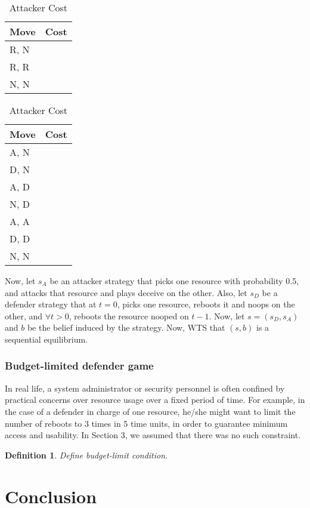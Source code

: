 \documentclass[11pt]{article}
\theoremstyle{plain}
\newtheorem*{definition}{Definition}
\begin{document}
\begin{table}[!htb]
    \caption{Cost Table}
    \begin{minipage}{.5\linewidth}
      \caption{Defender Cost}
      \centering
        \begin{tabular}{|l|l|}
\hline
Move & Cost \\ \hline
R, N &      \\ \hline
R, R &      \\ \hline
N, N &      \\ \hline
\end{tabular}
    \end{minipage}%
    \begin{minipage}{.5\linewidth}
      \centering
        \caption{Attacker Cost}
\begin{tabular}{|l|l|}
\hline
Move & Cost \\ \hline
A, N &      \\ \hline
D, N &      \\ \hline
A, D &      \\ \hline
N, D &      \\ \hline
A, A &      \\ \hline
D, D &      \\ \hline
N, N &      \\ \hline
\end{tabular}
    \end{minipage} 
\end{table}
Now, let $s_A$ be an attacker strategy that picks one resource with probability 0.5, and attacks that resource and plays deceive on the other. Also, let $s_D$ be a defender strategy that at $t=0$, picks one resource, reboots it and noops on the other, and $\forall t>0$, reboots the resource nooped on $t-1$. Now, let $s=(s_D,s_A)$ and $b$ be the belief induced by the strategy. Now, WTS that $(s,b)$ is a sequential equilibrium.



\subsubsection{Budget-limited defender game}
In real life, a system administrator or security personnel is often confined by practical concerns over resource usage over a fixed period of time. For example, in the case of a defender in charge of one resource, he/she might want to limit the number of reboots to 3 times in 5 time units, in order to guarantee minimum access and usability. In Section 3, we assumed that there was no such constraint.

\begin{definition}
Define budget-limit condition.
\end{definition}

\section{Conclusion}
    
\medskip


\end{document}
